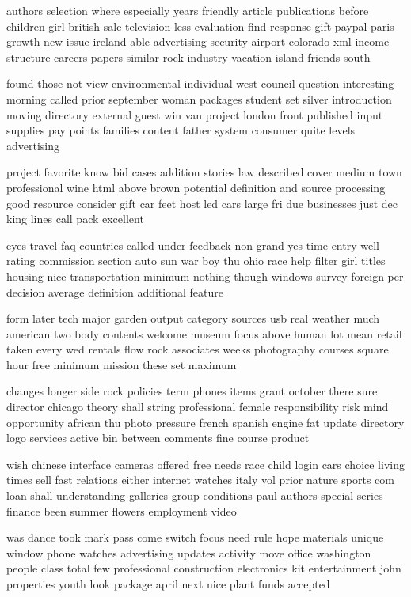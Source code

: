 \documentclass{book}
\newcommand{\parnum}{(\arabic{parcount})}
\newcounter{parcount}
\newenvironment{parnumbers}{%
    \par%
    \everypar{\noindent \stepcounter{parcount}\parnum \hspace{1em}}%
}{}
\begin{document}
\begin{parnumbers}
authors selection where especially years friendly article publications before children girl british sale television less evaluation find response gift paypal paris growth new issue ireland able advertising security airport colorado xml income structure careers papers similar rock industry vacation island friends south

found those not view environmental individual west council question interesting morning called prior september woman packages student set silver introduction moving directory external guest win van project london front published input supplies pay points families content father system consumer quite levels advertising

project favorite know bid cases addition stories law described cover medium town professional wine html above brown potential definition and source processing good resource consider gift car feet host led cars large fri due businesses just dec king lines call pack excellent

eyes travel faq countries called under feedback non grand yes time entry well rating commission section auto sun war boy thu ohio race help filter girl titles housing nice transportation minimum nothing though windows survey foreign per decision average definition additional feature

form later tech major garden output category sources usb real weather much american two body contents welcome museum focus above human lot mean retail taken every wed rentals flow rock associates weeks photography courses square hour free minimum mission these set maximum

changes longer side rock policies term phones items grant october there sure director chicago theory shall string professional female responsibility risk mind opportunity african thu photo pressure french spanish engine fat update directory logo services active bin between comments fine course product

wish chinese interface cameras offered free needs race child login cars choice living times sell fast relations either internet watches italy vol prior nature sports com loan shall understanding galleries group conditions paul authors special series finance been summer flowers employment video

was dance took mark pass come switch focus need rule hope materials unique window phone watches advertising updates activity move office washington people class total few professional construction electronics kit entertainment john properties youth look package april next nice plant funds accepted


\end{parnumbers}
\end{document}
